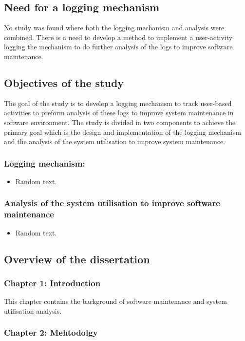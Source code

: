 \newpage

\subsection{Need for a logging mechanism}
No study was found where both the logging mechanism and analysis were combined.
There is a need to develop a method to implement a user-activity logging
the mechanism to do further analysis of the logs to improve software
maintenance.

\subsection{Objectives of the study}
The goal of the study is to develop a logging mechanism to track user-based
activities to preform analysis of these logs to improve system maintenance in
software environment. The study is divided in two components to achieve the
primary goal which is the design and implementation of the logging mechanism
and the analysis of the system utilisation to improve system maintenance.

\subsubsection{Logging mechanism:}
\begin{itemize}
    \item Random text.
\end{itemize}

\subsubsection{Analysis of the system utilisation to improve software maintenance}
\begin{itemize}
    \item Random text.
\end{itemize}

\subsection{Overview of the dissertation}
\subsubsection{Chapter 1: Introduction}
This chapter contains the background of software maintenance and system
utilisation analysis.
\subsubsection{Chapter 2: Mehtodolgy}

